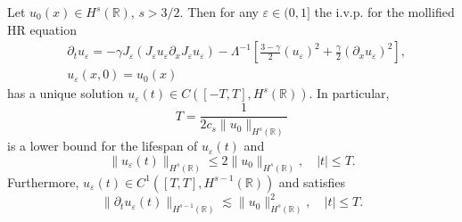 \documentclass{beamer}
\newcommand{\rr}{\mathbb{R}}
\newcommand{\p}{\partial}
\newcommand{\ee}{\varepsilon}
\begin{document}
%
%
%
\begin{frame}
%
%
\begin{lemma}
\label{hr_wp}
Let  $u_0(x) \in  H^s(\rr)$, $s >3/2$. Then for any $\ee\in (0, 1]$
the i.v.p. for the mollified HR equation 
%
%
%
\begin{align*} 
& \partial_t  u_\ee =
-\gamma J_\ee (J_\ee u_\ee \partial_x  J_\ee  u_\ee) - \Lambda^{-1} \left
[\frac{3-\gamma}{2}(u_\ee)^2 + \frac{\gamma}{2}(\p_x u_\ee)^2
\right ], 
\\
&  u_\ee(x, 0) = u_0 (x)
\label{burgers-moli-data-2}
\end{align*}
%
% 
%
%
%
%
%
%
has a unique solution $u_\ee( t)\in C([-T, T], H^s(\rr))$.  In particular,
%
%
%
\begin{equation*} \label{life-est}
T
=
\frac{1}{ 2 c_s \|u_0\|_{H^s(\rr)}}
\end{equation*}
%
%
%
is a lower bound for the lifespan of $u_\ee( t)$ and
%
%
%
\begin{equation*}
\label{u-e-Hs-bound}
\|u_\ee(t)\|_{H^s(\rr)}
\le
2 \|u_0 \|_{H^s(\rr)},
\quad
|t| \le T.
\end{equation*}
%
%
%
Furthermore,  $u_\ee( t)\in C^1([T, T], H^{s-1}(\rr))$ and satisfies
%
%
\begin{equation*}
\label{dt-u-e-Hs-bound}
\|\p_t u_\ee(t)\|_{H^{s-1}(\rr)}
\lesssim
\|u_0 \|_{H^s(\rr)}^2,
\quad
|t| \le T.
\end{equation*}
%
%
% 
\end{lemma}
%
%
\end{frame}
%
%
\end{document}

